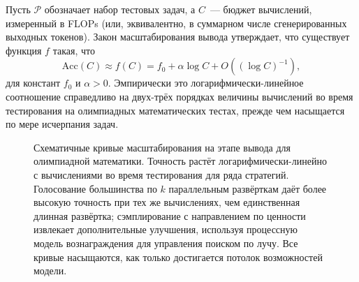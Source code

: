 Пусть $\mathcal{P}$ обозначает набор тестовых задач, а
$C$~--- бюджет вычислений, измеренный в FLOPs (или, эквивалентно, в
суммарном числе сгенерированных выходных токенов). Закон масштабирования вывода утверждает, что
существует функция $f$ такая, что
\begin{equation}
\label{eq:inference-scaling}
\text{Acc}(C) \approx f(C) = f_0 + \alpha \log C + O((\log C)^{-1}),
\end{equation}
для констант $f_0$ и $\alpha > 0$. Эмпирически это логарифмически-линейное
соотношение справедливо на двух-трёх порядках величины вычислений во время тестирования
на олимпиадных математических тестах, прежде чем насыщается по мере исчерпания задач.

\begin{figure}[ht]
\centering
{}
\caption{Схематичные кривые масштабирования на этапе вывода для олимпиадной
  математики. Точность растёт логарифмически-линейно с вычислениями во время тестирования для
  ряда стратегий. Голосование большинства по $k$ параллельным развёрткам
  даёт более высокую точность при тех же вычислениях, чем единственная длинная
  развёртка; сэмплирование с направлением по ценности извлекает дополнительные улучшения, используя
  процессную модель вознаграждения для управления поиском по лучу. Все кривые насыщаются,
  как только достигается потолок возможностей модели.}
\label{fig:inference-scaling}
\end{figure}

